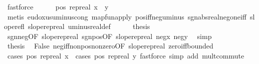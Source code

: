 \begin{isabellebody}
\ fastforce\isanewline
\ \ \ \ \isamarkupfalse%
\ {\isachardoublequoteopen}pos\ {\isacharparenleft}{\kern0pt}rep{\isacharunderscore}{\kern0pt}real\ {\isacharparenleft}{\kern0pt}x\ {\isacharasterisk}{\kern0pt}\ y{\isacharparenright}{\kern0pt}{\isacharparenright}{\kern0pt}{\isachardoublequoteclose}\ \isamarkupfalse%
\ {\isacharparenleft}{\kern0pt}metis\ eudoxus{\isacharunderscore}{\kern0pt}uminus{\isacharunderscore}{\kern0pt}cong\ map{\isacharunderscore}{\kern0pt}fun{\isacharunderscore}{\kern0pt}apply\ pos{\isacharunderscore}{\kern0pt}iff{\isacharunderscore}{\kern0pt}neg{\isacharunderscore}{\kern0pt}uminus\ sgn{\isacharunderscore}{\kern0pt}abs{\isacharunderscore}{\kern0pt}real{\isacharunderscore}{\kern0pt}neg{\isacharunderscore}{\kern0pt}one{\isacharunderscore}{\kern0pt}iff\ slope{\isacharunderscore}{\kern0pt}refl\ slope{\isacharunderscore}{\kern0pt}rep{\isacharunderscore}{\kern0pt}real\ uminus{\isacharunderscore}{\kern0pt}real{\isacharunderscore}{\kern0pt}def{\isacharparenright}{\kern0pt}\isanewline
\ \ \ \ \isamarkupfalse%
\ {\isacharquery}{\kern0pt}thesis\ \isamarkupfalse%
\ sgn{\isacharunderscore}{\kern0pt}neg{\isacharbrackleft}{\kern0pt}OF\ slope{\isacharunderscore}{\kern0pt}rep{\isacharunderscore}{\kern0pt}real{\isacharbrackright}{\kern0pt}\ sgn{\isacharunderscore}{\kern0pt}pos{\isacharbrackleft}{\kern0pt}OF\ slope{\isacharunderscore}{\kern0pt}rep{\isacharunderscore}{\kern0pt}real{\isacharbrackright}{\kern0pt}\ neg{\isacharunderscore}{\kern0pt}x\ neg{\isacharunderscore}{\kern0pt}y\ \isamarkupfalse%
\ simp\isanewline
\ \ \isamarkupfalse%
\isanewline
\ \ \isamarkupfalse%
\ \isamarkupfalse%
\ {\isacharquery}{\kern0pt}thesis\ \isamarkupfalse%
\ False\ neg{\isacharunderscore}{\kern0pt}iff{\isacharunderscore}{\kern0pt}nonpos{\isacharunderscore}{\kern0pt}nonzero{\isacharbrackleft}{\kern0pt}OF\ slope{\isacharunderscore}{\kern0pt}rep{\isacharunderscore}{\kern0pt}real{\isacharbrackright}{\kern0pt}\ zero{\isacharunderscore}{\kern0pt}iff{\isacharunderscore}{\kern0pt}bounded{\isacharprime}{\kern0pt}\isanewline
\ \ \ \ \isamarkupfalse%
\ {\isacharparenleft}{\kern0pt}cases\ {\isachardoublequoteopen}pos\ {\isacharparenleft}{\kern0pt}rep{\isacharunderscore}{\kern0pt}real\ x{\isacharparenright}{\kern0pt}{\isachardoublequoteclose}\ {\isacharsemicolon}{\kern0pt}\ cases\ {\isachardoublequoteopen}pos\ {\isacharparenleft}{\kern0pt}rep{\isacharunderscore}{\kern0pt}real\ y{\isacharparenright}{\kern0pt}{\isachardoublequoteclose}{\isacharparenright}{\kern0pt}\ {\isacharparenleft}{\kern0pt}fastforce\ simp\ add{\isacharcolon}{\kern0pt}\ mult{\isachardot}{\kern0pt}commute{\isacharparenright}{\kern0pt}{\isacharplus}{\kern0pt}\isanewline

\end{isabellebody}
